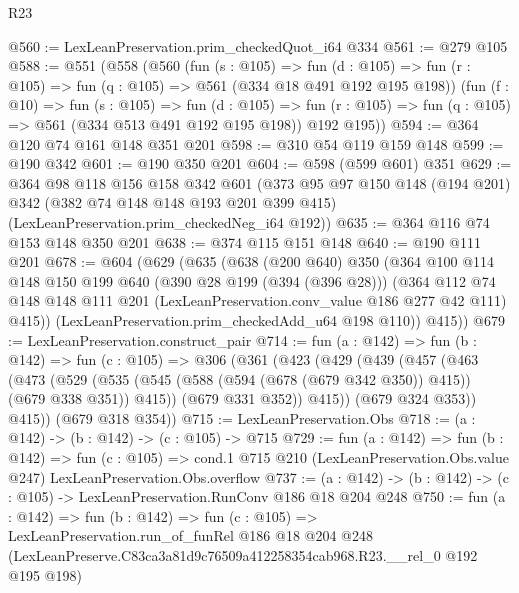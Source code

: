 \begin{lexlean}{R23}
\begin{coremodule}
@560 := LexLeanPreservation.prim_checkedQuot_i64 @334
@561 := @279 @105
@588 := @551
    (@558
      (@560
        (fun (s : @105) =>
        fun (d : @105) => fun (r : @105) => fun (q : @105) => @561 (@334 @18 @491 @192 @195 @198))
        (fun (f : @10) =>
        fun (s : @105) =>
        fun (d : @105) => fun (r : @105) => fun (q : @105) => @561 (@334 @513 @491 @192 @195 @198))
        @192
        @195))
@594 := @364 @120 @74 @161 @148 @351 @201
@598 := @310 @54 @119 @159 @148
@599 := @190 @342
@601 := @190 @350 @201
@604 := @598 (@599 @601) @351
@629 := @364
    @98
    @118
    @156
    @158
    @342
    @601
    (@373
      @95
      @97
      @150
      @148
      (@194 @201)
      @342
      (@382 @74 @148 @148 @193 @201 @399 @415)
      (LexLeanPreservation.prim_checkedNeg_i64 @192))
@635 := @364 @116 @74 @153 @148 @350 @201
@638 := @374 @115 @151 @148
@640 := @190 @111 @201
@678 := @604
    (@629
      (@635
        (@638
          (@200 @640)
          @350
          (@364
            @100
            @114
            @148
            @150
            @199
            @640
            (@390 @28 @199 (@394 (@396 @28)))
            (@364
              @112
              @74
              @148
              @148
              @111
              @201
              (LexLeanPreservation.conv_value @186 @277 @42 @111)
              @415))
          (LexLeanPreservation.prim_checkedAdd_u64 @198 @110))
        @415))
@679 := LexLeanPreservation.construct_pair
@714 := fun (a : @142) =>
  fun (b : @142) =>
  fun (c : @105) =>
  @306
    (@361
      (@423
        (@429
          (@439
            (@457
              (@463
                (@473
                  (@529
                    (@535 (@545 (@588 (@594 (@678 (@679 @342 @350)) @415)) (@679 @338 @351)) @415))
                  (@679 @331 @352))
                @415))
            (@679 @324 @353))
          @415))
      (@679 @318 @354))
@715 := LexLeanPreservation.Obs
@718 := (a : @142) -> (b : @142) -> (c : @105) -> @715
@729 := fun (a : @142) =>
  fun (b : @142) =>
  fun (c : @105) =>
  cond.{1} @715 @210 (LexLeanPreservation.Obs.value @247) LexLeanPreservation.Obs.overflow
@737 := (a : @142) -> (b : @142) -> (c : @105) -> LexLeanPreservation.RunConv @186 @18 @204 @248
@750 := fun (a : @142) =>
  fun (b : @142) =>
  fun (c : @105) =>
  LexLeanPreservation.run_of_funRel
    @186
    @18
    @204
    @248
    (LexLeanPreserve.C83ca3a81d9c76509a412258354cab968.R23.__rel_0 @192 @195 @198)
\end{coremodule}
\end{lexlean}
